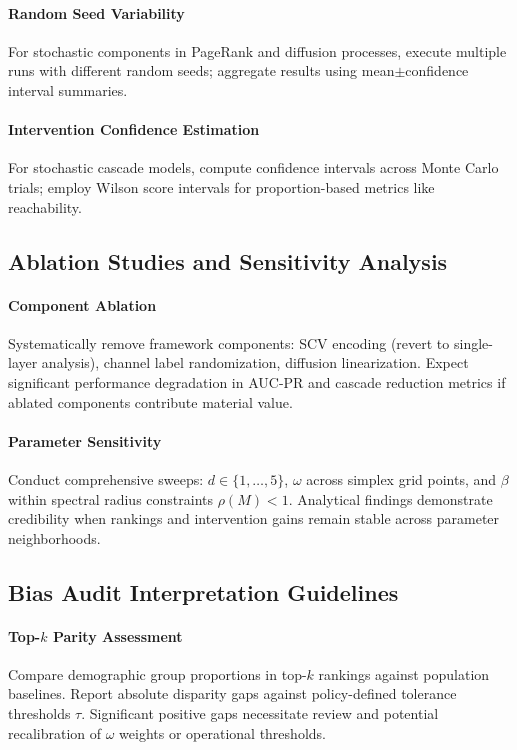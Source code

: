 \documentclass[12pt]{article}
\theoremstyle{plain}
\begin{document}
\paragraph{Random Seed Variability}
For stochastic components in PageRank and diffusion processes, execute multiple runs with different random seeds; aggregate results using mean$\pm$confidence interval summaries.

\paragraph{Intervention Confidence Estimation}
For stochastic cascade models, compute confidence intervals across Monte Carlo trials; employ Wilson score intervals for proportion-based metrics like reachability.

\subsection{Ablation Studies and Sensitivity Analysis}
\paragraph{Component Ablation}
Systematically remove framework components: SCV encoding (revert to single-layer analysis), channel label randomization, diffusion linearization. Expect significant performance degradation in AUC-PR and cascade reduction metrics if ablated components contribute material value.

\paragraph{Parameter Sensitivity}
Conduct comprehensive sweeps: $d\in\{1,\dots,5\}$, $\omega$ across simplex grid points, and $\beta$ within spectral radius constraints $\rho(M)<1$. Analytical findings demonstrate credibility when rankings and intervention gains remain stable across parameter neighborhoods.

\subsection{Bias Audit Interpretation Guidelines}
\paragraph{Top-$k$ Parity Assessment}
Compare demographic group proportions in top-$k$ rankings against population baselines. Report absolute disparity gaps against policy-defined tolerance thresholds $\tau$. Significant positive gaps necessitate review and potential recalibration of $\omega$ weights or operational thresholds.
\end{document}
